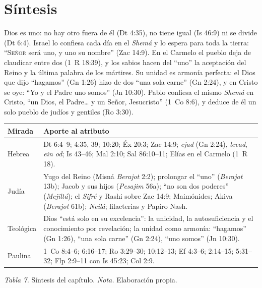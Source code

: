 \documentclass[11pt,letterpaper]{article}
\newcommand{\SENOR}{\textsc{Señor}}
\begin{document}
\section{Síntesis}

\begin{tcolorbox}[colback=papiro,colframe=azul,boxrule=1pt,arc=3pt]
Dios es uno: no hay otro fuera de él (Dt 4:35), no tiene igual (Is 46:9) ni se divide (Dt 6:4). Israel lo confiesa cada día en el \emph{Shemá} y lo espera para toda la tierra: ``\SENOR{} será uno, y uno su nombre'' (Zac 14:9). En el Carmelo el pueblo deja de claudicar entre dos (1~R 18:39), y los sabios hacen del ``uno'' la aceptación del Reino y la última palabra de los mártires. Su unidad es armonía perfecta: el Dios que dijo ``hagamos'' (Gn 1:26) hizo de dos ``una sola carne'' (Gn 2:24), y en Cristo se oye: ``Yo y el Padre uno somos'' (Jn 10:30). Pablo confiesa el mismo \emph{Shemá} en Cristo, ``un Dios, el Padre\ldots{} y un Señor, Jesucristo'' (1~Co 8:6), y deduce de él un solo pueblo de judíos y gentiles (Ro 3:30).
\end{tcolorbox}

\begin{center}\small\renewcommand{\arraystretch}{1.3}
\begin{tabular}{@{}L{3.0cm}L{11.4cm}@{}}
\toprule
\textbf{Mirada} & \textbf{Aporte al atributo} \\ \midrule
Hebrea & Dt 6:4--9; 4:35, 39; 10:20; Éx 20:3; Zac 14:9; \emph{ejad} (Gn 2:24), \emph{levad}, \emph{ein od}; Is 43--46; Mal 2:10; Sal 86:10--11; Elías en el Carmelo (1~R 18). \\
Judía & Yugo del Reino (Misná \emph{Berajot} 2:2); prolongar el ``uno'' (\emph{Berajot} 13b); Jacob y sus hijos (\emph{Pesajim} 56a); ``no son dos poderes'' (\emph{Mejiltá}); el \emph{Sifré} y Rashi sobre Zac 14:9; Maimónides; Akiva (\emph{Berajot} 61b); \emph{Neilá}; filacterias y Papiro Nash. \\
Teológica & Dios ``está solo en su excelencia'': la unicidad, la autosuficiencia y el conocimiento por revelación; la unidad como armonía: ``hagamos'' (Gn 1:26), ``una sola carne'' (Gn 2:24), ``uno somos'' (Jn 10:30). \\
Paulina & 1~Co 8:4--6; 6:16--17; Ro 3:29--30; 10:12--13; Ef 4:3--6; 2:14--15; 5:31--32; Flp 2:9--11 con Is 45:23; Col 2:9. \\
\bottomrule
\end{tabular}\par
{\footnotesize\color{gris}\textit{Tabla 7.} Síntesis del capítulo. \textit{Nota.} Elaboración propia.}
\end{center}
\end{document}
